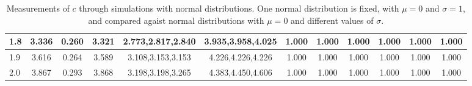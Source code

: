 \begin{table*}[h!]
\begin{center}
\begin{tabular}{| l | c | c | c | c | c | c | c | c | c | c | c |}
1.8 & 3.336 & 0.260 & 3.321 & 2.773,2.817,2.840 & 3.935,3.958,4.025  & 1.000  & 1.000  & 1.000  & 1.000  & 1.000  & 1.000 \\\hline
1.9 & 3.616 & 0.264 & 3.589 & 3.108,3.153,3.153 & 4.226,4.226,4.226  & 1.000  & 1.000  & 1.000  & 1.000  & 1.000  & 1.000 \\\hline
2.0 & 3.867 & 0.293 & 3.868 & 3.198,3.198,3.265 & 4.383,4.450,4.606  & 1.000  & 1.000  & 1.000  & 1.000  & 1.000  & 1.000 \\\hline
\end{tabular}
\caption{Measurements of $c$ through simulations
with normal distributions.
One normal distribution is fixed, with $\mu=0$ and $\sigma=1$,
and compared agaist normal distributions with $\mu=0$
and different values of $\sigma$.}
\end{center}
\end{table*}